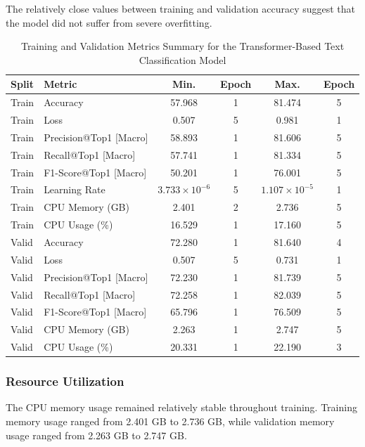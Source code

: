 \documentclass[10pt,a4paper,twocolumn]{article}
\begin{document}
The relatively close values between training and validation accuracy suggest that the model did not suffer from severe overfitting.

\begin{table}[t!]
\centering
\caption{Training and Validation Metrics Summary for the Transformer-Based Text Classification Model}
\begin{tabular}{|l|l|c|c|c|c|}
\hline
\textbf{Split} & \textbf{Metric} & \textbf{Min.} & \textbf{Epoch} & \textbf{Max.} & \textbf{Epoch} \\
\hline
Train & Accuracy & 57.968 & 1 & 81.474 & 5 \\
Train & Loss & 0.507 & 5 & 0.981 & 1 \\
Train & Precision@Top1 [Macro] & 58.893 & 1 & 81.606 & 5 \\
Train & Recall@Top1 [Macro] & 57.741 & 1 & 81.334 & 5 \\
Train & F1-Score@Top1 [Macro] & 50.201 & 1 & 76.001 & 5 \\
Train & Learning Rate & $3.733 \times 10^{-6}$ & 5 & $1.107 \times 10^{-5}$ & 1 \\
Train & CPU Memory (GB) & 2.401 & 2 & 2.736 & 5 \\
Train & CPU Usage (\%) & 16.529 & 1 & 17.160 & 5 \\
\hline
Valid & Accuracy & 72.280 & 1 & 81.640 & 4 \\
Valid & Loss & 0.507 & 5 & 0.731 & 1 \\
Valid & Precision@Top1 [Macro] & 72.230 & 1 & 81.739 & 5 \\
Valid & Recall@Top1 [Macro] & 72.258 & 1 & 82.039 & 5 \\
Valid & F1-Score@Top1 [Macro] & 65.796 & 1 & 76.509 & 5 \\
Valid & CPU Memory (GB) & 2.263 & 1 & 2.747 & 5 \\
Valid & CPU Usage (\%) & 20.331 & 1 & 22.190 & 3 \\
\hline
\end{tabular}
\label{tab:transformer_text_classification_metrics}
\end{table}

\subsubsection{Resource Utilization}

The CPU memory usage remained relatively stable throughout training. Training memory usage ranged from 2.401 GB to 2.736 GB, while validation memory usage ranged from 2.263 GB to 2.747 GB.
\end{document}

